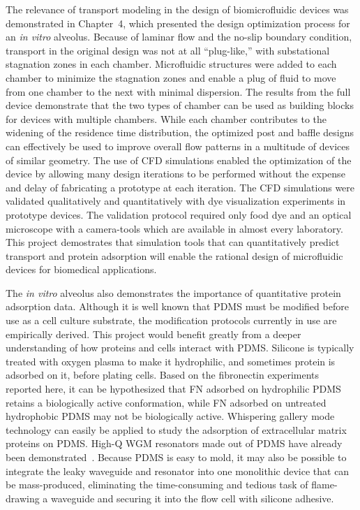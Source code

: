 The relevance of transport modeling in the design of biomicrofluidic
devices was demonstrated in Chapter~4, which presented the design
optimization process for an \emph{in vitro} alveolus. Because of laminar
flow and the no-slip boundary condition, transport in the original
design was not at all {}``plug-like,'' with substational stagnation
zones in each chamber. Microfluidic structures were added to each
chamber to minimize the stagnation zones and enable a plug of fluid
to move from one chamber to the next with minimal dispersion. The
results from the full device demonstrate that the two types of chamber
can be used as building blocks for devices with multiple chambers.
While each chamber contributes to the widening of the residence time
distribution, the optimized post and baffle designs can effectively
be used to improve overall flow patterns in a multitude of devices
of similar geometry. The use of CFD simulations enabled the optimization
of the device by allowing many design iterations to be performed without
the expense and delay of fabricating a prototype at each iteration.
The CFD simulations were validated qualitatively and quantitatively
with dye visualization experiments in prototype devices. The validation
protocol required only food dye and an optical microscope with a camera\nobreakdash-tools
which are available in almost every laboratory. This project demostrates
that simulation tools that can quantitatively predict transport and
protein adsorption will enable the rational design of microfluidic
devices for biomedical applications.

The \emph{in vitro} alveolus also demonstrates the importance of quantitative
protein adsorption data. Although it is well known that PDMS must
be modified before use as a cell culture substrate, the modification
protocols currently in use are empirically derived. This project would
benefit greatly from a deeper understanding of how proteins and cells
interact with PDMS. Silicone is typically treated with oxygen plasma
to make it hydrophilic, and sometimes protein is adsorbed on it, before
plating cells. Based on the fibronectin experiments reported here,
it can be hypothesized that FN adsorbed on hydrophilic PDMS retains
a biologically active conformation, while FN adsorbed on untreated
hydrophobic PDMS may not be biologically active. Whispering gallery
mode technology can easily be applied to study the adsorption of extracellular
matrix proteins on PDMS. High-Q WGM resonators made out of PDMS have
already been demonstrated~\cite{Martin2004}. Because PDMS is easy
to mold, it may also be possible to integrate the leaky waveguide
and resonator into one monolithic device that can be mass-produced,
eliminating the time-consuming and tedious task of flame-drawing a
waveguide and securing it into the flow cell with silicone adhesive.
